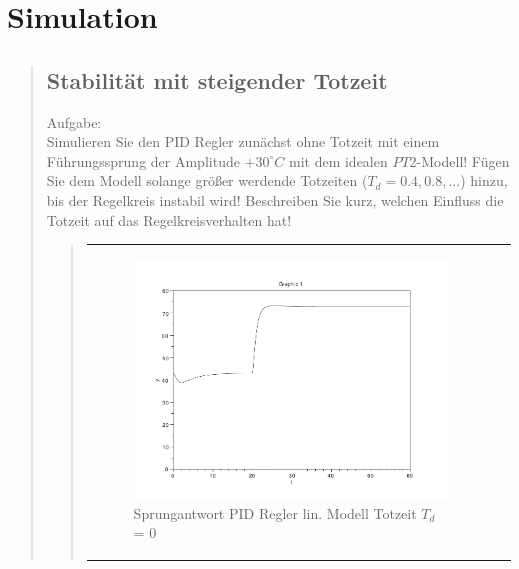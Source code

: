 \section{Simulation}
\begin{quote}
    
    \subsection{Stabilität mit steigender Totzeit}
    Aufgabe:\\
    Simulieren Sie den PID Regler zunächst ohne Totzeit mit einem Führungssprung der Amplitude $+30^{\circ}C$ mit dem
    idealen $PT2$-Modell! Fügen Sie dem Modell solange größer werdende Totzeiten ($T_d = 0.4, 0.8, . . .$) hinzu, bis
    der Regelkreis instabil wird! Beschreiben Sie kurz, welchen Einfluss die Totzeit auf das Regelkreisverhalten
    hat!\vspace{1em}
    
    \begin{quote}
            \begin{center}
                \begin{tabular}{ll}
                
                \hspace{-1cm}
                    \begin{minipage}{0.6\textwidth}
                        \begin{figure}[H]
                            \includegraphics[scale=0.4, trim = 0cm 0cm 0cm
                            0cm, clip]
                            {./Bilder/4_1_Td_0}
                              \caption{Sprungantwort PID Regler lin. Modell Totzeit $T_d$ = 0}
                        \end{figure}
                    \end{minipage}
                    

\end{tabular}
\end{center}
\end{quote}
\end{quote}
